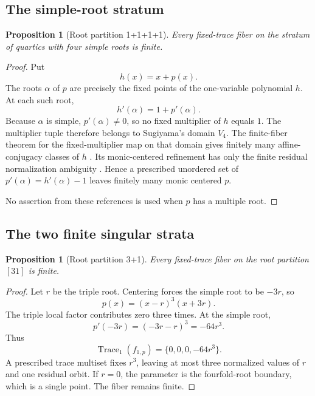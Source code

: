 \documentclass[11pt]{article}
\newtheorem{proposition}[theorem]{Proposition}
\theoremstyle{definition}
\newcommand{\Trace}{\operatorname{Trace}}
\begin{document}
\subsection{The simple-root stratum}

\begin{proposition}[Root partition 1+1+1+1]
\label{prop:1111}
Every fixed-trace fiber on the stratum of quartics with four simple roots is finite.
\end{proposition}

\begin{proof}
Put
\[
h(x)=x+p(x).
\]
The roots $\alpha$ of $p$ are precisely the fixed points of the one-variable polynomial $h$. At each such root,
\[
h'(\alpha)=1+p'(\alpha).
\]
Because $\alpha$ is simple, $p'(\alpha)\ne0$, so no fixed multiplier of $h$ equals $1$. The multiplier tuple therefore belongs to Sugiyama's domain $V_4$. The finite-fiber theorem for the fixed-multiplier map on that domain gives finitely many affine-conjugacy classes of $h$ \cite{Sugiyama2017}. Its monic-centered refinement has only the finite residual normalization ambiguity \cite{Sugiyama2023}. Hence a prescribed unordered set of $p'(\alpha)=h'(\alpha)-1$ leaves finitely many monic centered $p$.

No assertion from these references is used when $p$ has a multiple root.
\end{proof}

\subsection{The two finite singular strata}

\begin{proposition}[Root partition 3+1]
\label{prop:31}
Every fixed-trace fiber on the root partition $[31]$ is finite.
\end{proposition}

\begin{proof}
Let $r$ be the triple root. Centering forces the simple root to be $-3r$, so
\begin{equation}
p(x)=(x-r)^3(x+3r).
\label{eq:31-param}
\end{equation}
The triple local factor contributes zero three times. At the simple root,
\[
p'(-3r)=(-3r-r)^3=-64r^3.
\]
Thus
\begin{equation}
\Trace_1(f_{1,p})=\{0,0,0,-64r^3\}.
\label{eq:31-trace}
\end{equation}
A prescribed trace multiset fixes $r^3$, leaving at most three normalized values of $r$ and one residual orbit. If $r=0$, the parameter is the fourfold-root boundary, which is a single point. The fiber remains finite.
\end{proof}
\end{document}
